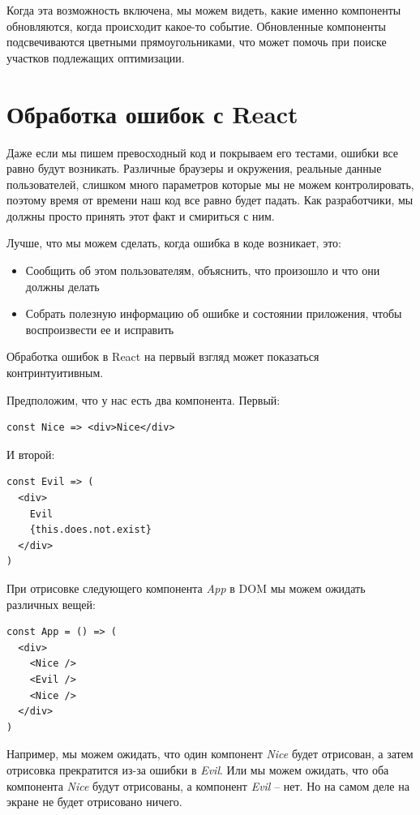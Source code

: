 Когда эта возможность включена, мы можем видеть, какие именно компоненты обновляются, когда происходит какое-то событие. Обновленные компоненты подсвечиваются цветными прямоугольниками, что может помочь при поиске участков подлежащих оптимизации.

\section{Обработка ошибок с React}

Даже если мы пишем превосходный код и покрываем его тестами, ошибки все равно будут возникать. Различные браузеры и окружения, реальные данные пользователей, слишком много параметров которые мы не можем контролировать, поэтому время от времени наш код все равно будет падать. Как разработчики, мы должны просто принять этот факт и смириться с ним.

Лучше, что мы можем сделать, когда ошибка в коде возникает, это:

\begin{itemize}
  \item Сообщить об этом пользователям, объяснить, что произошло и что они должны делать
  \item Собрать полезную информацию об ошибке и состоянии приложения, чтобы воспроизвести ее и исправить
\end{itemize}

Обработка ошибок в React на первый взгляд может показаться контринтуитивным.

Предположим, что у нас есть два компонента. Первый:

\begin{lstlisting}
const Nice => <div>Nice</div>
\end{lstlisting}

И второй:

\begin{lstlisting}
const Evil => (
  <div>
    Evil
    {this.does.not.exist}
  </div>
)
\end{lstlisting}

При отрисовке следующего компонента \textit{App} в DOM мы можем ожидать различных вещей:

\begin{lstlisting}
const App = () => (
  <div>
    <Nice />
    <Evil />
    <Nice />
  </div>
)
\end{lstlisting}

Например, мы можем ожидать, что один компонент \textit{Nice} будет отрисован, а затем отрисовка прекратится из-за ошибки в \textit{Evil}. Или мы можем ожидать, что оба компонента \textit{Nice} будут отрисованы, а компонент \textit{Evil} -- нет. Но на самом деле на экране не будет отрисовано ничего.

